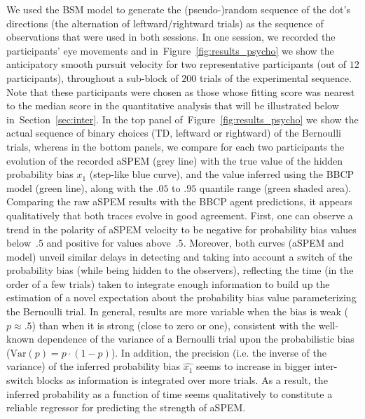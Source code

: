 \documentclass[12pt,english]{article}%
\newcommand{\seeFig}[1]{Figure~\ref{fig:#1}}
\newcommand{\seeApp}[1]{Appendix~\ref{app:#1}}
\newcommand{\seeSec}[1]{Section~\ref{sec:#1}}
\begin{document}
We used the BSM model to generate the (pseudo-)random sequence of
the dot's directions (the alternation of leftward/rightward trials)
as the sequence of observations that were used in both sessions.
In one session, we recorded the participants' eye movements and
in~\seeFig{results_psycho} we show the anticipatory smooth pursuit velocity 
for two representative participants (out of $12$ participants), throughout a sub-block of $200$ trials of the experimental sequence.
Note that these participants were chosen as those
whose fitting score was nearest to the median score in the quantitative analysis
that will be illustrated below in~\seeSec{inter}.
In the top panel  of~\seeFig{results_psycho} we show the actual sequence of binary choices
(TD, leftward or rightward) of the Bernoulli trials, 
whereas in the bottom panels, 
we compare for each two participants
the evolution of the recorded aSPEM (grey line) with
the true value of the hidden probability bias $x_1$ 
(step-like blue curve),
and the value inferred using the BBCP model (green line), 
along with the $.05$ to $.95$ quantile range (green shaded area).
Comparing the raw aSPEM results with the BBCP agent predictions,
it appears qualitatively that both traces evolve in good agreement.
First, one can observe a trend in the polarity of aSPEM velocity
to be negative for probability bias values below~$.5$ and positive for values above~$.5$.
Moreover, both curves (aSPEM and model) unveil similar delays in detecting and 
taking into account a switch of the probability bias (while being hidden to the observers),
reflecting the time (in the order of a few trials) taken to integrate enough information
to build up the estimation of a novel expectation about the probability bias value 
parameterizing the Bernoulli trial.
In general, results are more variable when the bias is weak ($p\approx .5$)
than when it is strong (close to zero or one),
consistent with the well-known dependence of the variance of a Bernoulli trial
upon the probabilistic bias ($\textrm{Var}(p)= p \cdot (1-p)$).
In addition, the precision (i.e. the inverse of the variance)
of the inferred probability bias $\hat{x_1}$ seems to increase
in bigger inter-switch blocks as information is integrated over more trials.
As a result, the inferred probability as a function of time
seems qualitatively to constitute a reliable regressor
for predicting the strength of aSPEM.
\end{document}
